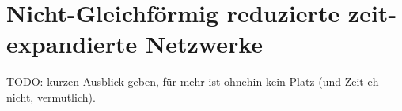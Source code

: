 \section{Nicht-Gleichförmig reduzierte zeit-expandierte Netzwerke}\label{sec:nonunif_cond}
TODO: kurzen Ausblick geben, für mehr ist ohnehin kein Platz (und Zeit eh nicht,
vermutlich).
